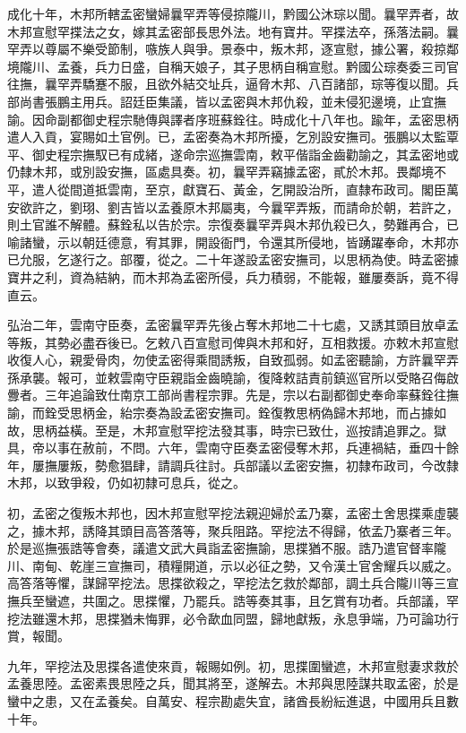 \begin{pinyinscope}
成化十年，木邦所轄孟密蠻婦曩罕弄等侵掠隴川，黔國公沐琮以聞。曩罕弄者，故木邦宣慰罕揲法之女，嫁其孟密部長思外法。地有寶井。罕揲法卒，孫落法嗣。曩罕弄以尊屬不樂受節制，嗾族人與爭。景泰中，叛木邦，逐宣慰，據公署，殺掠鄰境隴川、孟養，兵力日盛，自稱天娘子，其子思柄自稱宣慰。黔國公琮奏委三司官往撫，曩罕弄驕蹇不服，且欲外結交址兵，逼脅木邦、八百諸部，琮等復以聞。兵部尚書張鵬主用兵。詔廷臣集議，皆以孟密與木邦仇殺，並未侵犯邊境，止宜撫諭。因命副都御史程宗馳傳與譯者序班蘇銓往。時成化十八年也。踰年，孟密思柄遣人入貢，宴賜如土官例。已，孟密奏為木邦所擾，乞別設安撫司。張鵬以太監覃平、御史程宗撫馭已有成緒，遂命宗巡撫雲南，敕平偕詣金齒勸諭之，其孟密地或仍隸木邦，或別設安撫，區處具奏。初，曩罕弄竊據孟密，貳於木邦。畏鄰境不平，遣人從間道抵雲南，至京，獻寶石、黃金，乞開設治所，直隸布政司。閣臣萬安欲許之，劉珝、劉吉皆以孟養原木邦屬夷，今曩罕弄叛，而請命於朝，若許之，則土官誰不解體。蘇銓私以告於宗。宗復奏曩罕弄與木邦仇殺已久，勢難再合，已喻諸蠻，示以朝廷德意，宥其罪，開設衙門，令還其所侵地，皆踴躍奉命，木邦亦已允服，乞遂行之。部覆，從之。二十年遂設孟密安撫司，以思柄為使。時孟密據寶井之利，資為結納，而木邦為孟密所侵，兵力積弱，不能報，雖屢奏訴，竟不得直云。

弘治二年，雲南守臣奏，孟密曩罕弄先後占奪木邦地二十七處，又誘其頭目放卓孟等叛，其勢必盡吞後已。乞敕八百宣慰司俾與木邦和好，互相救援。亦敕木邦宣慰收復人心，親愛骨肉，勿使孟密得乘間誘叛，自致孤弱。如孟密聽諭，方許曩罕弄孫承襲。報可，並敕雲南守臣親詣金齒曉諭，復降敕詰責前鎮巡官所以受賂召侮啟釁者。三年追論致仕南京工部尚書程宗罪。先是，宗以右副都御史奉命率蘇銓往撫諭，而銓受思柄金，紿宗奏為設孟密安撫司。銓復教思柄偽歸木邦地，而占據如故，思柄益橫。至是，木邦宣慰罕挖法發其事，時宗已致仕，巡按請追罪之。獄具，帝以事在赦前，不問。六年，雲南守臣奏孟密侵奪木邦，兵連禍結，垂四十餘年，屢撫屢叛，勢愈猖肆，請調兵往討。兵部議以孟密安撫，初隸布政司，今改隸木邦，以致爭殺，仍如初隸可息兵，從之。

初，孟密之復叛木邦也，因木邦宣慰罕挖法親迎婦於孟乃寨，孟密土舍思揲乘虛襲之，據木邦，誘降其頭目高答落等，聚兵阻路。罕挖法不得歸，依孟乃寨者三年。於是巡撫張誥等會奏，議遣文武大員詣孟密撫諭，思揲猶不服。誥乃遣官督率隴川、南甸、乾崖三宣撫司，積糧開道，示以必征之勢，又令漢土官舍耀兵以威之。高答落等懼，謀歸罕挖法。思揲欲殺之，罕挖法乞救於鄰部，調土兵合隴川等三宣撫兵至蠻遮，共圍之。思揲懼，乃罷兵。誥等奏其事，且乞賞有功者。兵部議，罕挖法雖還木邦，思揲猶未悔罪，必令歃血同盟，歸地獻叛，永息爭端，乃可論功行賞，報聞。

九年，罕挖法及思揲各遣使來貢，報賜如例。初，思揲圍蠻遮，木邦宣慰妻求救於孟養思陸。孟密素畏思陸之兵，聞其將至，遂解去。木邦與思陸謀共取孟密，於是蠻中之患，又在孟養矣。自萬安、程宗勘處失宜，諸酋長紛紜進退，中國用兵且數十年。


\end{pinyinscope}
